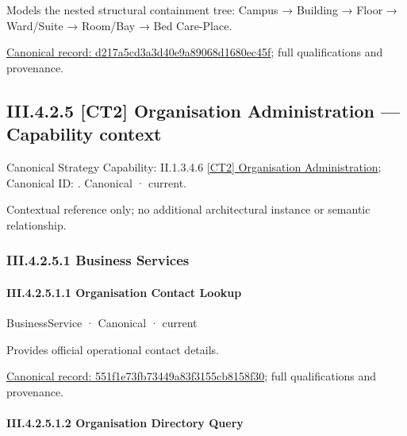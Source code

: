 Models the nested structural containment tree: Campus → Building → Floor → Ward/Suite → Room/Bay → Bed Care-Place.


{\footnotesize \href{../../../../continuum/business/business-function/d217a5cd3a3d40e9a89068d1680ec45f.md}{Canonical record: d217a5cd3a3d40e9a89068d1680ec45f}; full qualifications and provenance.}\par
\subsection*{III.4.2.5 [CT2] Organisation Administration — Capability context}
\label{navigation:III.4.2.5}

{\small Canonical Strategy Capability: II.1.3.4.6 \hyperref[element:14fbdc5ce3dd4c2092c5397dab3ed743]{[CT2] Organisation Administration}; Canonical ID: \texttt{}. Canonical · current.}\par
Contextual reference only; no additional architectural instance or semantic relationship.\par
\subsubsection*{III.4.2.5.1 Business Services}
\label{navigation:III.4.2.5.1}

\paragraph*{III.4.2.5.1.1 Organisation Contact Lookup}
\label{navigation:III.4.2.5.1.1}

\label{element:551f1e73fb73449a83f3155cb8158f30}
{\small BusinessService · Canonical · current}\par

Provides official operational contact details.


{\footnotesize \href{../../../../continuum/business/business-service/551f1e73fb73449a83f3155cb8158f30.md}{Canonical record: 551f1e73fb73449a83f3155cb8158f30}; full qualifications and provenance.}\par
\paragraph*{III.4.2.5.1.2 Organisation Directory Query}
\label{navigation:III.4.2.5.1.2}

